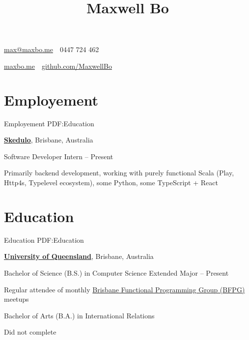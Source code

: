 \documentclass[a4paper,10pt,oneside]{article}
\begin{document}

\title{Maxwell Bo}

\begin{subtitle}
\par \href{mailto:max@maxbo.me}{max@maxbo.me} \,\BulletSymbol\, 0447 724 462

\par \href{http://maxbo.me/}{maxbo.me} \,\BulletSymbol\, \href{https://github.com/MaxwellBo}{github.com/MaxwellBo}

\end{subtitle}

\begin{body}


\section
{Employement}
{Employement}
{PDF:Education}

\href{https://skedulo.com/}{\textbf{Skedulo}}, Brisbane, Australia
\par Software Developer Intern\hfill {} -- Present 
\begin{detail}
	\BulletItem Primarily backend development, working with purely functional Scala (Play, Http4s, Typelevel ecosystem),\newline
	some Python, some TypeScript + React
\end{detail}


\section
{Education}
{Education}
{PDF:Education}

\href{https://www.uq.edu.au/}{\textbf{University of Queensland}}, Brisbane, Australia
\par Bachelor of Science (B.S.) in Computer Science Extended Major\hfill {} -- Present
\begin{detail}
\BulletItem Regular attendee of monthly \href{https://www.meetup.com/en-AU/Brisbane-Functional-Programming-Group/}{Brisbane Functional Programming Group (BFPG)} meetups
\end{detail}
\par Bachelor of Arts (B.A.) in International Relations\hfill {}
\begin{detail}
Did not complete
\end{detail}


\end{body}
\end{document}
